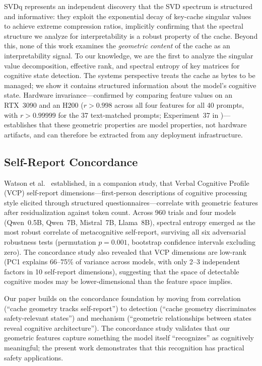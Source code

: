 SVDq \cite{svdq2025} represents an independent discovery that the \kvcache SVD spectrum is structured and informative: they exploit the exponential decay of key-cache singular values to achieve extreme compression ratios, implicitly confirming that the spectral structure we analyze for interpretability is a robust property of the cache.
Beyond this, none of this work examines the \emph{geometric content} of the cache as an interpretability signal.
To our knowledge, we are the first to analyze the singular value decomposition, effective rank, and spectral entropy of key matrices for cognitive state detection.
The systems perspective treats the cache as bytes to be managed; we show it contains structured information about the model's cognitive state.
Hardware invariance---confirmed by comparing feature values on an RTX~3090 and an H200 ($r > 0.998$ across all four features for all 40 prompts, with $r > 0.99999$ for the 37 text-matched prompts; Experiment~37 in \cite{hackathon})---establishes that these geometric properties are model properties, not hardware artifacts, and can therefore be extracted from any deployment infrastructure.

\subsection{Self-Report Concordance}

Watson et al.\ \cite{watson_concordance} established, in a companion study, that Verbal Cognitive Profile (VCP) self-report dimensions---first-person descriptions of cognitive processing style elicited through structured questionnaires---correlate with \kvcache geometric features after \fwl residualization against token count.
Across 960 trials and four models (Qwen~0.5B, Qwen~7B, Mistral~7B, Llama~8B), spectral entropy emerged as the most robust correlate of metacognitive self-report, surviving all six adversarial robustness tests (permutation $p = 0.001$, bootstrap confidence intervals excluding zero).
The concordance study also revealed that VCP dimensions are low-rank (PC1 explains 66--75\% of variance across models, with only 2--3 independent factors in 10 self-report dimensions), suggesting that the space of detectable cognitive modes may be lower-dimensional than the feature space implies.

Our paper builds on the concordance foundation by moving from correlation (``cache geometry tracks self-report'') to detection (``cache geometry discriminates safety-relevant states'') and mechanism (``geometric relationships between states reveal cognitive architecture'').
The concordance study validates that our geometric features capture something the model itself ``recognizes'' as cognitively meaningful; the present work demonstrates that this recognition has practical safety applications.
